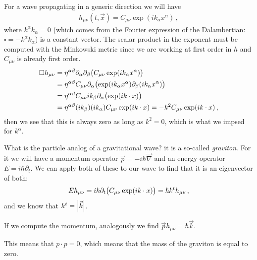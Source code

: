 \documentclass[main.tex]{subfiles}
\begin{document}
For a wave propagating in a generic direction we will have 
%
\begin{align}
h_{\mu \nu } (t, \vec{x}) = C_{\mu \nu } \exp(i k_{\alpha } x^{\alpha })
\,,
\end{align}
%
where \(k^{\alpha } k_{\alpha } = 0\) (which comes from the Fourier expression of the Dalambertian: \(\square = -k^{\alpha } k_{\alpha }\)) is a constant vector. The scalar product in the exponent must be computed with the Minkowski metric since we are working at  first order in \(h\) and \(C_{\mu \nu }\) is already first order.  
%
\begin{subequations}
\begin{align}
\square h_{\mu \nu } &= \eta^{\alpha \beta } \partial_{\alpha } \partial_{\beta } \qty(C_{\mu \nu } \exp(i k_{\alpha }x^{\alpha }))  \\
&= \eta^{\alpha  \beta } C_{\mu \nu } \partial_{\alpha } \qty(\exp(i k_{\alpha } x^{\alpha }) \partial_{\beta } \qty(i k_{\alpha } x^{\alpha }))  \\
&= \eta^{\alpha  \beta } C_{\mu \nu } i k_{ \beta } \partial_{\alpha } \qty(\exp(i k \cdot x )) \\
&= \eta^{\alpha \beta } (i k_{ \beta }) (ik_{\alpha }) C_{\mu \nu } \exp(i k \cdot x) = - k^2 C_{\mu \nu } \exp(i k \cdot x)
\,,
\end{align}
\end{subequations}
%
then we see that this is always zero as long as \(k^2=0\), which is what we impsed for \(k^{\alpha }\). 

What is the particle analog of a gravitational wave? it is a so-called \emph{graviton}. 
For it we will have a momentum operator \(\vec{p} = - i \hbar \vec{\nabla}\) and an energy operator \(E = i \hbar \partial_{t}\). We can apply both of these to our wave to find that it is an eigenvector of both: 
%
\begin{align}
E h_{\mu \nu } = i \hbar \partial_{t} \qty(C_{\mu \nu } \exp(i k \cdot x))= \hbar k^{t} h_{\mu \nu } 
\,,
\end{align}
%
and we know that \(k^{t} = \abs{\vec{k}}\). 

If we compute the momentum, analogously we find \(\vec{p} h_{\mu \nu } = \hbar \vec{k}\). 

This means that \(p \cdot p  = 0\), which means that the mass of the graviton is equal to zero. 
\end{document}
